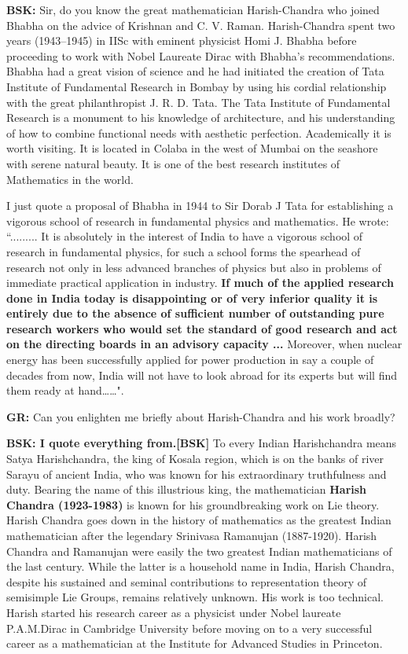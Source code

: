\textbf{BSK:} Sir, do you know the great mathematician Harish-Chandra who joined Bhabha on the advice of Krishnan and C. V. Raman. Harish-Chandra spent two years (1943--1945) in IISc with eminent physicist Homi J. Bhabha before proceeding to work with Nobel Laureate Dirac with Bhabha’s recommendations.  Bhabha had a great vision of science and he had initiated the creation of Tata Institute of Fundamental Research in Bombay by using his cordial relationship with the great philanthropist J. R. D. Tata.  The Tata Institute of Fundamental Research is a monument to his knowledge of architecture, and his understanding of how to combine functional needs with aesthetic perfection. Academically it is worth visiting. It is located in Colaba in the west of Mumbai on the seashore with serene natural beauty. It is one of the best research institutes of Mathematics in the world.

I just quote a proposal \cite{chap17-key09SM} of Bhabha in 1944 to Sir Dorab J Tata for establishing a vigorous school of research in fundamental physics and mathematics.  He wrote:  ``......... It is absolutely in the interest of India to have a vigorous school of research in fundamental physics, for such a school forms the spearhead of research not only in less advanced branches of physics but also in problems of immediate practical application in industry. \textbf{If much of the applied research done in India today is disappointing or of very inferior quality it is entirely due to the absence of sufficient number of outstanding pure research workers who would set the standard of good research and act on the directing boards in an advisory capacity ...} Moreover, when nuclear energy has been successfully applied for power production in say a couple of decades from now, India will not have to look abroad for its experts but will find them ready at hand……".

\textbf{GR:} Can you enlighten me briefly about Harish-Chandra and his work broadly? 

\textbf{BSK: I quote everything from.[BSK]} To every Indian Harishchandra means Satya Harishchandra, the king of Kosala region, which is on the banks of river Sarayu of ancient India, who was known for his extraordinary truthfulness and duty. Bearing the name of this illustrious king, the mathematician \textbf{Harish Chandra (1923-1983)} is known for his groundbreaking work on Lie theory. Harish Chandra goes down in the history of mathematics as the greatest Indian mathematician after the legendary Srinivasa Ramanujan (1887-1920). Harish Chandra and Ramanujan were easily the two greatest Indian mathematicians of the last century. While the latter is a household name in India, Harish Chandra, despite his sustained and seminal contributions to representation theory of semisimple Lie Groups, remains relatively unknown. His work is too technical. Harish started his research career as a physicist under Nobel laureate P.A.M.Dirac in Cambridge University before moving on to a very successful career as a mathematician at the Institute for Advanced Studies in Princeton.

